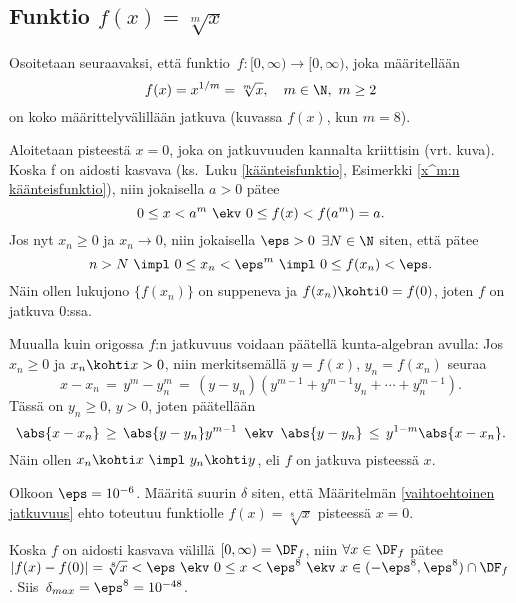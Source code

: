 \subsection{Funktio $f(x) = \sqrt[m]{x}$}

Osoitetaan seuraavaksi, että funktio $f:[0,\infty)\rightarrow [0,\infty)$, joka määritellään
\[
f(x)=x^{1/m}=\sqrt[m]{x},\quad m\in\N, \ m\geq 2
\]
on koko määrittelyvälillään jatkuva (kuvassa $f(x)$, kun $m=8$).
\begin{figure}[H]
\begin{center}
\end{center}
\end{figure}
Aloitetaan pisteestä $x=0$, joka on jatkuvuuden kannalta kriittisin (vrt. kuva). Koska f on 
aidosti kasvava (ks.\ Luku \ref{käänteisfunktio}, Esimerkki \ref{x^m:n käänteisfunktio}),
niin jokaisella $a>0$ pätee
\[
0 \le x < a^m\ \ekv\ 0 \le f(x) < f(a^m) = a.
\]
Jos nyt $x_n\geq 0$ ja $x_n\rightarrow 0$, niin jokaisella $\eps>0$ $\exists N\in\N$ siten,
että pätee
\[
n>N \ \impl \ 0 \le x_n < \eps^m \ \impl\ 0 \le f(x_n) < \eps.
\]
Näin ollen lukujono $\{f(x_n)\}$ on suppeneva ja $f(x_n) \kohti 0=f(0)$, joten $f$ on jatkuva 
$0$:ssa.

Muualla kuin origossa $f$:n jatkuvuus voidaan päätellä kunta-algebran avulla: Jos 
$x_n \ge 0$ ja $x_n \kohti x>0$, niin merkitsemällä $y=f(x)$, $y_n=f(x_n)$ seuraa
\[
x-x_n \,=\, y^m-y_n^m \,=\, (y-y_n)(y^{m-1}+y^{m-1}y_n+\cdots +y_n^{m-1}).
\]
Tässä on $y_n \ge 0$, $y>0$, joten päätellään
\[
\abs{x-x_n}\,\ge\,\abs{y-y_n}y^{m-1} \,\ \ekv\,\ \abs{y-y_n}\,\le\,y^{1-m}\abs{x-x_n}.
\]
Näin ollen $x_n \kohti x \ \impl\ y_n \kohti y$, eli $f$ on jatkuva pisteessä $x$.
\begin{Exa} \label{epsilon ja delta} Olkoon $\eps = 10^{-6}$. Määritä suurin $\delta$ siten,
että Määritelmän \ref{vaihtoehtoinen jatkuvuus} ehto toteutuu funktiolle $f(x)=\sqrt[8]{x}$
pisteessä $x=0$.
\end{Exa}
\ratk Koska $f$ on aidosti kasvava välillä $[0,\infty)=\DF_f$, niin $\forall x\in\DF_f$ pätee
$|f(x)-f(0)|=\sqrt[8]{x} < \eps\ \ekv\ 0 \le x < \eps^8\ \ekv\ x\in(-\eps^8,\eps^8)\cap\DF_f$.
Siis $\,\delta_{max} = \eps^8 = 10^{-48}$. \loppu

